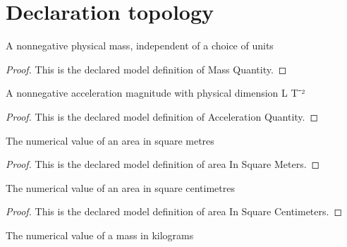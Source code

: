 \section{Declaration topology}
\begin{definition}
  \label{def:physics:phyx-mini-0390:phyxminiproblems-problemphyxmini0390-massquantity}
  A nonnegative physical mass, independent of a choice of units
\end{definition}
\begin{proof}
  This is the declared model definition of Mass Quantity.
\end{proof}
\begin{definition}
  \label{def:physics:phyx-mini-0390:phyxminiproblems-problemphyxmini0390-accelerationquantity}
  A nonnegative acceleration magnitude with physical dimension L T⁻²
\end{definition}
\begin{proof}
  This is the declared model definition of Acceleration Quantity.
\end{proof}
\begin{definition}
  \label{def:physics:phyx-mini-0390:phyxminiproblems-problemphyxmini0390-areainsquaremeters}
  The numerical value of an area in square metres
\end{definition}
\begin{proof}
  This is the declared model definition of area In Square Meters.
\end{proof}
\begin{definition}
  \label{def:physics:phyx-mini-0390:phyxminiproblems-problemphyxmini0390-areainsquarecentimeters}
  The numerical value of an area in square centimetres
\end{definition}
\begin{proof}
  This is the declared model definition of area In Square Centimeters.
\end{proof}
\begin{definition}
  \label{def:physics:phyx-mini-0390:phyxminiproblems-problemphyxmini0390-massinkilograms}
  The numerical value of a mass in kilograms
\end{definition}
